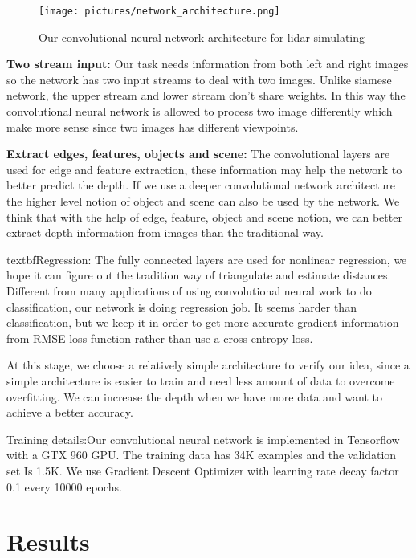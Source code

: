 \documentclass[10pt,twocolumn,letterpaper]{article}
\begin{document}
\begin{figure}
\centering
   \caption{Our convolutional neural network architecture for lidar simulating}
   \texttt{[image: pictures/network\_architecture.png]}
\label{network}
\end{figure}

\textbf{Two stream input:} Our task needs information from both left and right images so the network has two input streams to deal with two images. Unlike siamese network, the upper stream and lower stream don’t share weights. In this way the convolutional neural network is allowed to process two image differently which make more sense since two images has different viewpoints. 


\textbf{Extract edges, features, objects and scene:} The convolutional layers are used for edge and feature extraction, these information may help the network to better predict the depth. If we use a deeper convolutional network architecture the higher level notion of object and scene can also be used by the network. We think that with the help of edge, feature, object and scene notion, we can better extract depth information from images than the traditional way.


textbf{Regression:} The fully connected layers are used for nonlinear regression, we hope it can figure out the tradition way of triangulate and estimate distances. Different from many applications of using convolutional neural work to do classification, our network is doing regression job. It seems harder than classification, but we keep it in order to get more accurate gradient information from RMSE loss function rather than use a cross-entropy loss.


At this stage, we choose a relatively simple architecture to verify our idea, since a simple architecture is easier to train and need less amount of data to overcome overfitting. We can increase the depth when we have more data and want to achieve a better accuracy. 


Training details:Our convolutional neural network is implemented in Tensorflow  with a GTX 960 GPU. The training data has 34K examples and the validation set Is 1.5K. We use Gradient Descent Optimizer with learning rate decay factor 0.1 every 10000 epochs. 

\section{Results}
\end{document}
